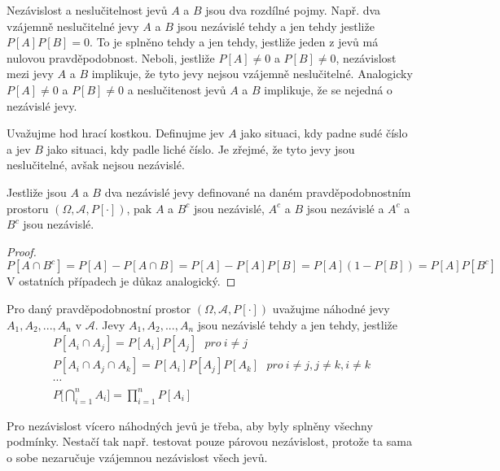 Nezávislost a neslučitelnost jevů $A$ a $B$ jsou dva rozdílné pojmy. Např. dva vzájemně neslučitelné jevy $A$ a $B$ jsou nezávislé tehdy a jen tehdy jestliže $P[A]P[B] = 0$. To je splněno tehdy a jen tehdy, jestliže jeden z jevů má nulovou pravděpodobnost. Neboli, jestliže $P[A] \not= 0$ a $P[B] \not= 0$, nezávislost mezi jevy $A$ a $B$ implikuje, že tyto jevy nejsou vzájemně neslučitelné. Analogicky $P[A] \not= 0$ a $P[B] \not= 0$ a neslučitenost jevů $A$ a $B$ implikuje, že se nejedná o nezávislé jevy.

\begin{example}
Uvažujme hod hrací kostkou. Definujme jev $A$ jako situaci, kdy padne sudé číslo a jev $B$ jako situaci, kdy padle liché číslo. Je zřejmé, že tyto jevy jsou neslučitelné, avšak nejsou nezávislé. 
\end{example}

\begin{theorem}
Jestliže jsou $A$ a $B$ dva nezávislé jevy definované na daném pravděpodobnostním prostoru $(\Omega, \mathscr{A}, P[\cdot])$, pak $A$ a $B^c$ jsou nezávislé, $A^c$ a $B$ jsou nezávislé a $A^c$ a $B^c$ jsou nezávislé.
\end{theorem}
\begin{proof}
\begin{equation*}
P[A \cap B^c] = P[A] - P[A \cap B] = P[A] - P[A] P[B] = P[A](1 - P[B]) = P[A]P[B^c] 
\end{equation*}
V ostatních případech je důkaz analogický.
\end{proof}
\begin{definition}
Pro daný pravděpodobnostní prostor $(\Omega, \mathscr{A}, P[\cdot])$ uvažujme náhodné jevy $A_1, A_2, ..., A_n$ v $\mathscr{A}$. Jevy $A_1, A_2, ..., A_n$ jsou nezávislé tehdy a jen tehdy, jestliže
\begin{gather*}
P[A_i \cap A_j] = P[A_i]P[A_j]~~~\textit{pro}~i \not= j\\
P[A_i \cap A_j \cap A_k] = P[A_i]P[A_j]P[A_k]~~~\textit{pro}~i \not= j, j \not= k, i \not= k\\
\cdots\\
P\Big[\bigcap_{i = 1}^n A_i \Big] = \prod_{i=1}^n P[A_i]
\end{gather*}
\end{definition}
Pro nezávislost vícero náhodných jevů je třeba, aby byly splněny všechny podmínky. Nestačí tak např. testovat pouze párovou nezávislost, protože ta sama o sobe nezaručuje vzájemnou nezávislost všech jevů.

